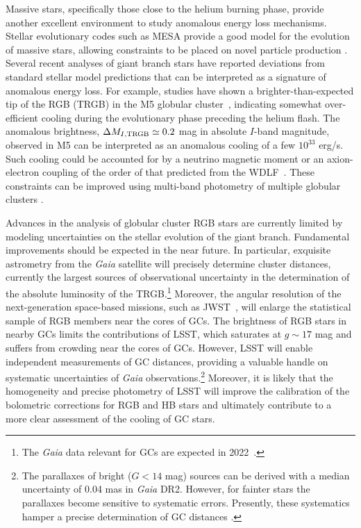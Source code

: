 Massive stars, specifically those close to the helium burning phase, provide another excellent environment to study anomalous energy loss mechanisms. 
Stellar evolutionary codes such as MESA \citep{1009.1622} provide a good model for the evolution of massive stars, allowing constraints to be placed on novel particle production \citep[\eg,][]{1210.1271,1611.05852}.
Several recent analyses of giant branch stars have reported deviations from standard stellar model predictions that can be interpreted as a signature of anomalous energy loss.
For example, studies have shown a brighter-than-expected tip of the RGB (TRGB) in the M5 globular cluster~\citep{Viaux:2013lha,Viaux:2013hca}, indicating somewhat over-efficient cooling during the evolutionary phase preceding the helium flash.
The anomalous brightness, $\Delta M_{I,{\rm TRGB}}\simeq 0.2$ mag in absolute $I$-band magnitude, observed in M5 can be interpreted as an anomalous cooling of a few $10^{33}$ erg/s.
Such cooling could be accounted for by a neutrino magnetic moment or an axion-electron coupling of the order of that predicted from the WDLF~\citep{Viaux:2013lha}. 
These constraints can be improved using multi-band photometry of multiple globular clusters \citep[\eg,][]{Straniero:2018fbv}.

Advances in the analysis of globular cluster RGB stars are currently limited by modeling uncertainties on the stellar evolution of the giant branch.
Fundamental improvements should be expected in the near future. 
In particular, exquisite astrometry from the {\it Gaia} satellite will precisely determine cluster distances, currently the largest sources of observational uncertainty in the determination of the absolute luminosity of the TRGB.\footnote{The {\it Gaia} data relevant for GCs are expected in 2022~\citep{Gaia}.}
Moreover, the angular resolution of the next-generation space-based missions, such as JWST~\citep{Gardner:2006ky}, will enlarge the statistical sample of RGB members near the cores of GCs. 
The brightness of RGB stars in nearby GCs limits the contributions of LSST, which saturates at $g \sim 17$ mag and suffers from crowding near the cores of GCs.
However, LSST will enable independent measurements of GC distances, providing a valuable handle on systematic uncertainties of {\it Gaia} observations.\footnote{The parallaxes of bright ($G<14$ mag) sources can be derived with a median uncertainty of 0.04 mas in {\it Gaia} DR2. However, for fainter stars the parallaxes become sensitive to systematic errors.  Presently, these systematics hamper a precise determination of GC distances \citep{Chen:2018}.}
Moreover, it is likely that the homogeneity and precise photometry of LSST will improve the calibration of the bolometric corrections for RGB and HB stars and ultimately contribute to a more clear assessment of the cooling of GC stars.


